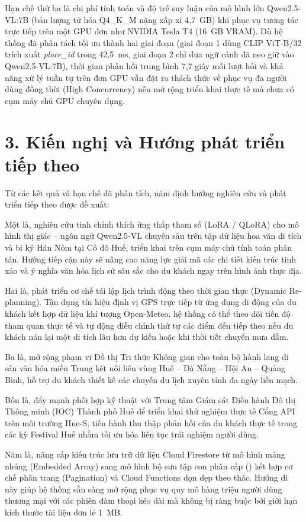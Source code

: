 Hạn chế thứ ba là chi phí tính toán và độ trễ suy luận của mô hình lớn Qwen2.5-VL:7B (bản lượng tử hóa Q4\_K\_M nặng xấp xỉ 4,7~GB) khi phục vụ tương tác trực tiếp trên một GPU đơn như NVIDIA Tesla T4 (16~GB VRAM). Dù hệ thống đã phân tách tối ưu thành hai giai đoạn (giai đoạn 1 dùng CLIP ViT-B/32 trích xuất \textit{place\_id} trong 42,5~ms, giai đoạn 2 chỉ đưa ngữ cảnh đã neo giữ vào Qwen2.5-VL:7B), thời gian phản hồi trung bình 7,7 giây mỗi lượt hỏi và khả năng xử lý tuần tự trên đơn GPU vẫn đặt ra thách thức về phục vụ đa người dùng đồng thời (High Concurrency) nếu mở rộng triển khai thực tế mà chưa có cụm máy chủ GPU chuyên dụng.

\section*{3. Kiến nghị và Hướng phát triển tiếp theo}
{}

Từ các kết quả và hạn chế đã phân tích, năm định hướng nghiên cứu và phát triển tiếp theo được đề xuất:

Một là, nghiên cứu tinh chỉnh thích ứng thấp tham số (LoRA / QLoRA) cho mô hình thị giác -- ngôn ngữ Qwen2.5-VL chuyên sâu trên tập dữ liệu hoa văn di tích và bi ký Hán Nôm tại Cố đô Huế, triển khai trên cụm máy chủ tính toán phân tán. Hướng tiếp cận này sẽ nâng cao năng lực giải mã các chi tiết kiến trúc tinh xảo và ý nghĩa văn hóa lịch sử sâu sắc cho du khách ngay trên hình ảnh thực địa.

Hai là, phát triển cơ chế tái lập lịch trình động theo thời gian thực (Dynamic Re-planning). Tận dụng tín hiệu định vị GPS trực tiếp từ ứng dụng di động của du khách kết hợp dữ liệu khí tượng Open-Meteo, hệ thống có thể theo dõi tiến độ tham quan thực tế và tự động điều chỉnh thứ tự các điểm đến tiếp theo nếu du khách nán lại một di tích lâu hơn dự kiến hoặc khi thời tiết chuyển mưa dầm.

Ba là, mở rộng phạm vi Đồ thị Tri thức Không gian cho toàn bộ hành lang di sản văn hóa miền Trung kết nối liên vùng Huế -- Đà Nẵng -- Hội An -- Quảng Bình, hỗ trợ du khách thiết kế các chuyến du lịch xuyên tỉnh đa ngày liền mạch.

Bốn là, đẩy mạnh phối hợp kỹ thuật với Trung tâm Giám sát Điều hành Đô thị Thông minh (IOC) Thành phố Huế để triển khai thử nghiệm thực tế Cổng API trên môi trường Hue-S, tiến hành thu thập phản hồi của du khách thực tế trong các kỳ Festival Huế nhằm tối ưu hóa liên tục trải nghiệm người dùng.

Năm là, nâng cấp kiến trúc lưu trữ dữ liệu Cloud Firestore từ mô hình mảng nhúng (Embedded Array) sang mô hình bộ sưu tập con phân cấp () kết hợp cơ chế phân trang (Pagination) và Cloud Functions dọn dẹp theo thác. Hướng đi này giúp hệ thống sẵn sàng mở rộng phục vụ quy mô hàng triệu người dùng thương mại với các phiên đàm thoại kéo dài mà không bị ràng buộc bởi giới hạn kích thước tài liệu đơn lẻ 1~MB.
